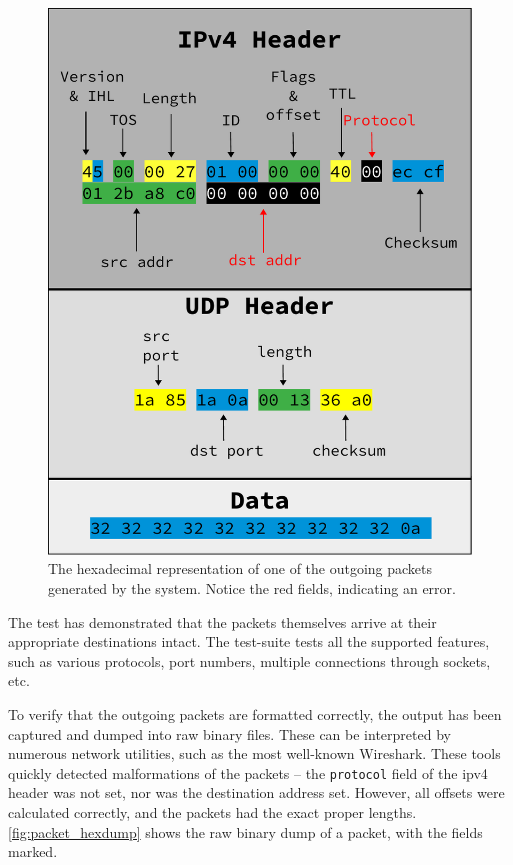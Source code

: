 \begin{figure}[h]
\centering
\includegraphics[width=\linewidth]{evaluation/hexdump.pdf}
	\caption{The hexadecimal representation of one of the outgoing packets
	generated by the system. Notice the red fields, indicating an error.}
\label{fig:packet_hexdump}
\end{figure}

The test has demonstrated that the packets themselves arrive at their
appropriate destinations intact. The test-suite tests all the supported
features, such as various protocols, port numbers, multiple connections through
sockets, etc.

To verify that the outgoing packets are formatted correctly, the output has
been captured and dumped into raw binary files. These can be interpreted by
numerous network utilities, such as the most well-known Wireshark.
These tools quickly detected malformations of the packets -- the
\texttt{protocol} field of the \gls{ipv4} header was not set, nor was the
destination address set. However, all offsets were calculated correctly, and
the packets had the exact proper lengths.
\autoref{fig:packet_hexdump} shows the raw binary dump of a packet, with the fields
marked.


